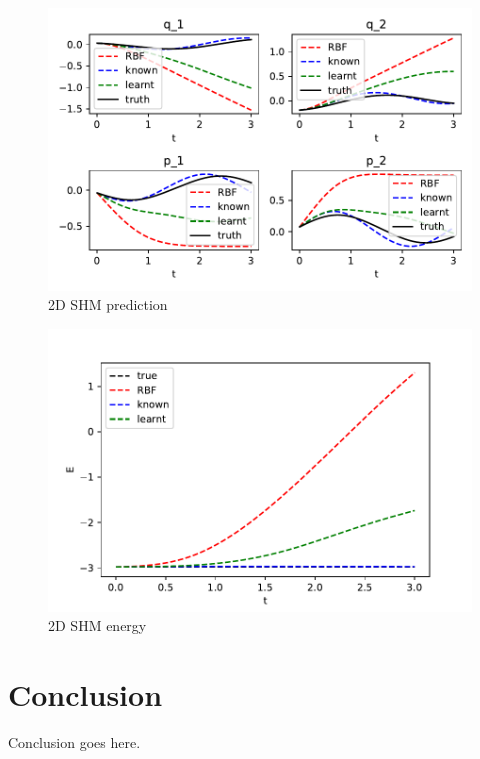 \documentclass{statsmsc}
\begin{document}
\begin{figure}[H] 
  \includegraphics[width=0.6\linewidth]{../codes/figures/double_pendulum_predicted.pdf}
  \centering
  \caption{2D SHM prediction}
  \label{fig:double_pendulum_prediction}
\end{figure}

\begin{figure}[H] 
  \includegraphics[width=0.6\linewidth]{../codes/figures/double_pendulum_energy.pdf}
  \centering
  \caption{2D SHM energy}
  \label{fig:double_pendulum_energy}
\end{figure}



\chapter{Conclusion}


Conclusion goes here. 






%
%
\end{document}
